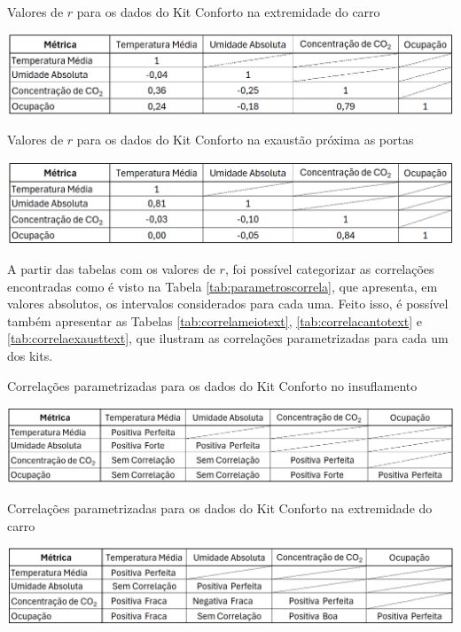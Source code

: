 \documentclass[acronym,symbols,table]{fei}
\begin{document}
\begin{table}[!htb]
 \centering
    \caption{Valores de $r$ para os dados do Kit Conforto na extremidade do carro}
    \includegraphics[width=1\linewidth]{Tabelas/correlacantonum2.png}
    \label{tab:correlacantonum}
\end{table}

\begin{table}[!htb]
 \centering
    \caption{Valores de $r$ para os dados do Kit Conforto na exaustão próxima as portas}
    \includegraphics[width=1\linewidth]{Tabelas/correlaexaustnum2.png}
    \label{tab:correlaexaustnum}
\end{table}
\newpage

A partir das tabelas com os valores de $r$, foi possível categorizar as correlações encontradas como é visto na Tabela \ref{tab:parametroscorrela}, que apresenta, em valores absolutos, os intervalos considerados para cada uma. Feito isso, é possível também apresentar as Tabelas \ref{tab:correlameiotext}, \ref{tab:correlacantotext} e \ref{tab:correlaexausttext}, que ilustram as correlações parametrizadas para cada um dos kits.

\begin{table}[!htb]
 \centering
    \caption{Correlações parametrizadas para os dados do Kit Conforto no insuflamento}
    \includegraphics[width=1\linewidth]{Tabelas/correlameiotext2.png}
    \label{tab:correlameiotext}
\end{table}

\begin{table}[!htb]
 \centering
    \caption{Correlações parametrizadas para os dados do Kit Conforto na extremidade do carro}
    \includegraphics[width=1\linewidth]{Tabelas/correlacantotext2.png}
    \label{tab:correlacantotext}
\end{table}
\end{document}
